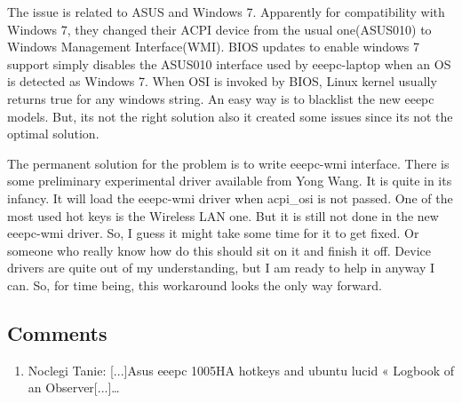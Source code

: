 The issue is related to ASUS and Windows 7. Apparently for compatibility with Windows 7, they changed their ACPI device from the usual one(ASUS010) to Windows Management Interface(WMI). BIOS updates to enable windows 7 support simply disables the ASUS010 interface used by eeepc-laptop when an OS is detected as Windows 7. When OSI is invoked by BIOS, Linux kernel usually returns true for any windows string. An easy way is to blacklist the new eeepc models. But, its not the right solution also it created some issues since its not the optimal solution.

The permanent solution for the problem is to write eeepc-wmi interface. There is some preliminary experimental driver available from Yong Wang. It is quite in its infancy. It will load the eeepc-wmi driver when acpi_osi is not passed. One of the most used hot keys is the Wireless LAN one. But it is still not done in the new eeepc-wmi driver. So, I guess it might take some time for it to get fixed. Or someone who really know how do this should sit on it and finish it off. Device drivers are quite out of my understanding, but I am ready to help in anyway I can. So, for time being, this workaround looks the only way forward.

\subsection{Comments}
\begin{enumerate}
 \item Noclegi Tanie: 
[...]Asus eeepc 1005HA hotkeys and ubuntu lucid « Logbook of an Observer[...]…
\end{enumerate}

\newpage 